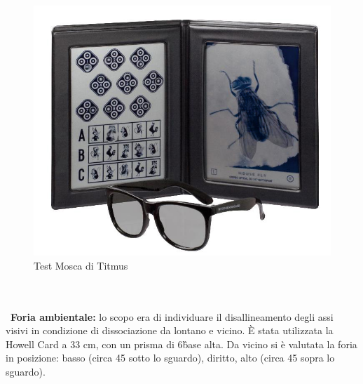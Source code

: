 \begin{figure}[h!]
	\centering
	\includegraphics[scale=0.22]{source/immagini/titmus.jpg}
	\caption[Semantic Web stack]{Test Mosca di Titmus}
	\label{fig:issuexample}
\end{figure}
\\\ \\\
\textbf{Foria ambientale:} lo scopo era di individuare il disallineamento degli assi visivi in condizione di dissociazione da
lontano e vicino. È stata utilizzata la Howell Card a 33 cm, con un prisma di 6\^ base alta. Da vicino si è valutata la foria
in posizione: basso (circa 45\° sotto lo sguardo), diritto, alto (circa 45\° sopra lo sguardo).

